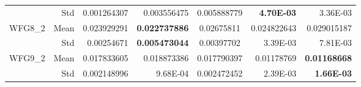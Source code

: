 \begin{table*}[htbp]
\begin{tabular}{rrrrrrr}
          & Std   & 0.001264307 & 0.003556475 & \multicolumn{1}{c}{0.005888779} & \textbf{4.70E-03} & 3.36E-03 \\
    \multirow{2}[0]{*}{WFG8\_2} & Mean  & 0.023929291 & \textbf{0.022737886} & \multicolumn{1}{c}{0.02675811} & 0.024822643 & 0.029015187 \\
          & Std   & 0.00254671 & \textbf{0.005473044} & \multicolumn{1}{c}{0.00397702} & 3.39E-03 & 7.81E-03 \\
    \multirow{2}[0]{*}{WFG9\_2} & Mean  & 0.017833605 & 0.018873386 & \multicolumn{1}{c}{0.017790397} & 0.01178769 & \textbf{0.01168668} \\
          & Std   & 0.002148996 & 9.68E-04 & \multicolumn{1}{c}{0.002472452} & 2.39E-03 & \textbf{1.66E-03} \\
    \bottomrule
    \end{tabular}%
  \label{tab:WFGSP}%
\end{table*}%
